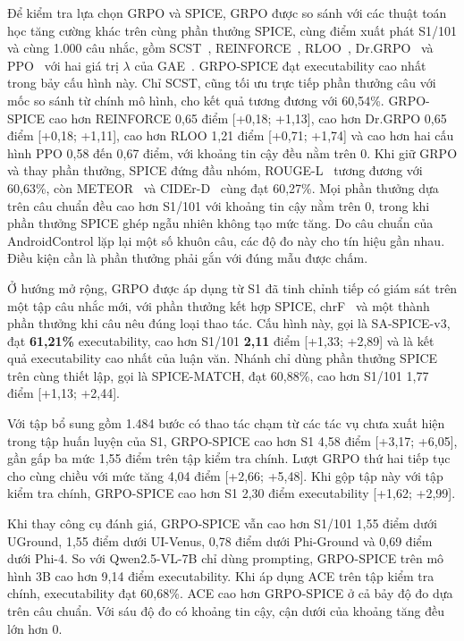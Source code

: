 Để kiểm tra lựa chọn GRPO và SPICE, GRPO được so sánh với các thuật toán học tăng cường khác trên cùng phần thưởng SPICE, cùng điểm xuất phát S1/101 và cùng 1.000 câu nhắc, gồm SCST~\cite{scst}, REINFORCE~\cite{williams1992}, RLOO~\cite{rloo}, Dr.GRPO~\cite{drgrpo} và PPO~\cite{ppo} với hai giá trị $\lambda$ của GAE~\cite{gae}. GRPO-SPICE đạt executability cao nhất trong bảy cấu hình này. Chỉ SCST, cũng tối ưu trực tiếp phần thưởng câu với mốc so sánh từ chính mô hình, cho kết quả tương đương với 60,54\%. GRPO-SPICE cao hơn REINFORCE 0,65 điểm [+0,18; +1,13], cao hơn Dr.GRPO 0,65 điểm [+0,18; +1,11], cao hơn RLOO 1,21 điểm [+0,71; +1,74] và cao hơn hai cấu hình PPO 0,58 đến 0,67 điểm, với khoảng tin cậy đều nằm trên 0. Khi giữ GRPO và thay phần thưởng, SPICE đứng đầu nhóm, ROUGE-L~\cite{rouge} tương đương với 60,63\%, còn METEOR~\cite{meteor} và CIDEr-D~\cite{cider} cùng đạt 60,27\%. Mọi phần thưởng dựa trên câu chuẩn đều cao hơn S1/101 với khoảng tin cậy nằm trên 0, trong khi phần thưởng SPICE ghép ngẫu nhiên không tạo mức tăng. Do câu chuẩn của AndroidControl lặp lại một số khuôn câu, các độ đo này cho tín hiệu gần nhau. Điều kiện cần là phần thưởng phải gắn với đúng mẫu được chấm.

Ở hướng mở rộng, GRPO được áp dụng từ S1 đã tinh chỉnh tiếp có giám sát trên một tập câu nhắc mới, với phần thưởng kết hợp SPICE, chrF~\cite{chrf} và một thành phần thưởng khi câu nêu đúng loại thao tác. Cấu hình này, gọi là SA-SPICE-v3, đạt \textbf{61,21\%} executability, cao hơn S1/101 \textbf{2,11} điểm [+1,33; +2,89] và là kết quả executability cao nhất của luận văn. Nhánh chỉ dùng phần thưởng SPICE trên cùng thiết lập, gọi là SPICE-MATCH, đạt 60,88\%, cao hơn S1/101 1,77 điểm [+1,13; +2,44].

Với tập bổ sung gồm 1.484 bước có thao tác chạm từ các tác vụ chưa xuất hiện trong tập huấn luyện của S1, GRPO-SPICE cao hơn S1 4,58 điểm [+3,17; +6,05], gần gấp ba mức 1,55 điểm trên tập kiểm tra chính. Lượt GRPO thứ hai tiếp tục cho cùng chiều với mức tăng 4,04 điểm [+2,66; +5,48]. Khi gộp tập này với tập kiểm tra chính, GRPO-SPICE cao hơn S1 2,30 điểm executability [+1,62; +2,99].

Khi thay công cụ đánh giá, GRPO-SPICE vẫn cao hơn S1/101 1,55 điểm dưới UGround, 1,55 điểm dưới UI-Venus, 0,78 điểm dưới Phi-Ground và 0,69 điểm dưới Phi-4. So với Qwen2.5-VL-7B chỉ dùng prompting, GRPO-SPICE trên mô hình 3B cao hơn 9,14 điểm executability. Khi áp dụng ACE trên tập kiểm tra chính, executability đạt 60,68\%. ACE cao hơn GRPO-SPICE ở cả bảy độ đo dựa trên câu chuẩn. Với sáu độ đo có khoảng tin cậy, cận dưới của khoảng tăng đều lớn hơn 0.

